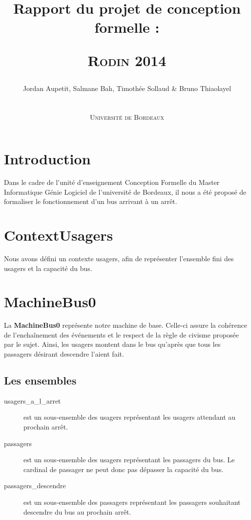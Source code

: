 \documentclass[a4paper,titlepage]{report}
\title{Rapport du projet de conception formelle :
	\begin{center}
		\textsc{Rodin 2014}
	\end{center}
}
\author{Jordan Aupetit, Salmane Bah, Timothée Sollaud \& Bruno Thiaolayel\\
	\\
	\\ \textsc{Université de Bordeaux}
}
\begin{document}
	\maketitle
	\tableofcontents
	\newpage
	\thispagestyle{empty}	
	\newpage
\markboth{}{}
\section{Introduction}
	Dans le cadre de l'unité d'enseignement Conception Formelle du Master Informatique Génie Logiciel de l'université de Bordeaux, il nous a été proposé de formaliser le fonctionnement d'un bus arrivant à un arrêt.



\section{ContextUsagers}
	Nous avons défini un contexte usagers, afin de représenter l'ensemble fini des usagers et la capacité du bus.\\

\section{MachineBus0}
	La \textbf{MachineBus0} représente notre machine de base. Celle-ci assure la cohérence de l'enchaînement des événements et le respect de la règle de civisme proposée par le sujet. Ainsi, les usagers montent dans le bus qu'après que tous les passagers désirant descendre l'aient fait.\\
	
	\subsection{Les ensembles}
		\begin{description}
			\item[usagers\_a\_l\_arret] est un sous-ensemble des usagers représentant les usagers attendant au prochain arrêt.\\
			\item[passagers] est un sous-ensemble des usagers représentant les passagers du bus. Le cardinal de passager ne peut donc pas dépasser la capacité du bus.\\
			\item[passagers\_descendre] est un sous-ensemble des passagers représentant les passagers souhaitant descendre du bus au prochain arrêt.\\
		\end{description}
		
\end{document}
